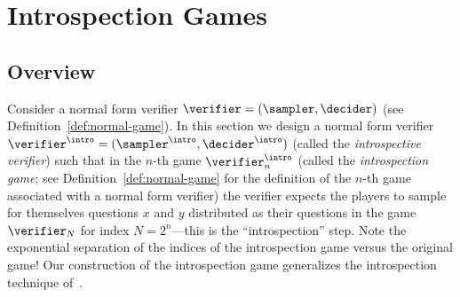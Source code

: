 \section{Introspection Games}
\label{sec:introspection}

\newcommand{\ai}[1][y,\, a]{A^\Intro_{#1}}
\newcommand{\bs}[1][z,\, a]{B^\Sample_{#1}}
\newcommand{\br}[1][y,y^\perp, a]{B^\Read_{#1}}
\newcommand{\ahk}[1][y_{<k}]{A^{\Hide{k}}_{#1}}
\newcommand{\ahp}[1][y_{\le k}]{A^{\Hide{k+1}}_{#1}}
\newcommand{\bhk}[1][y_{<k}]{B^{\Hide{k}}_{#1}}
\newcommand{\bhp}[1][y_{\le k}]{B^{\Hide{k+1}}_{#1}}
\newcommand{\z}[1][z]{\sigma^Z_{#1}}
\newcommand{\x}[1][x]{\sigma^X_{#1}}

\newcommand{\La}{[L(\cdot) = y]}
\newcommand{\Lk}[1][k]{[L_{#1,\, y_{<#1}}(\cdot) = y_{#1}]}
\newcommand{\Llk}[1][k]{[L_{<#1}(\cdot) = y_{<#1}]}
\newcommand{\Llek}[1][k]{[L_{\le #1}(\cdot) = y_{\le #1}]}
\newcommand{\Lperpk}[1][k]{[L_{#1,\, y_{<#1}}^\perp (\cdot) = y_{#1}^\perp]}

\newcommand{\aigek}[1][y_{\ge k},\, a]{A^{\Intro,\, y_{<k}}_{#1}}
\newcommand{\aigk}[1][y_{> k},\, a]{A^{\Intro,\, y_{\le k}}_{#1}}
\newcommand{\bsL}{\bs[\La,\, a]}
\newcommand{\zL}{\z[\La]}
\newcommand{\zLk}[1][k]{\sigma^{Z}_{\Lk[#1]}}
\newcommand{\zLlk}[1][k]{\z[{\Llk[#1]}]}
\newcommand{\zLlek}{\z[\Llek]}
\newcommand{\xLperpk}[1][k]{\sigma^{X}_{\Lperpk[#1]}}

\newcommand{\aizk}[1][y,\, a]{A^{\Intro,\, Z_{<k}}_{#1}}

\subsection{Overview}
\label{sec:intro-overview}

Consider a normal form verifier $\verifier = (\sampler, \decider)$ (see
Definition~\ref{def:normal-game}).
In this section we design a normal form verifier $\verifier^\intro =
(\sampler^\intro, \decider^\intro)$ (called the \emph{introspective verifier})
such that in the $n$-th game $\verifier^\intro_n$ (called the
\emph{introspection game}; see Definition~\ref{def:normal-game} for the
definition of the $n$-th game associated with a normal form verifier) the
verifier expects the players to sample for themselves questions $x$ and $y$
distributed as their questions in the game $\verifier_N$ for index $N =
2^n$---this is the ``introspection'' step.
Note the exponential separation of the indices of the introspection game versus
the original game!
Our construction of the introspection game generalizes the introspection
technique of~\cite{NW19}.

